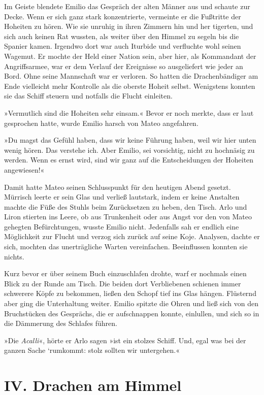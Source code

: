 Im Geiste blendete Emilio das Gespräch der alten Männer aus und
schaute zur Decke. Wenn er sich ganz stark konzentrierte, vermeinte
er die Fußtritte der Hoheiten zu hören. Wie sie unruhig in ihren
Zimmern hin und her tigerten, und sich auch keinen Rat wussten, als
weiter über den Himmel zu segeln bis die Spanier kamen. Irgendwo
dort war auch Iturbide und verfluchte wohl seinen Wagemut. Er
mochte der Held einer Nation sein, aber hier, als Kommandant der
Angriffsarmee, war er dem Verlauf der Ereignisse so ausgeliefert
wie jeder an Bord. Ohne seine Mannschaft war er verloren. So hatten
die Drachenbändiger am Ende vielleicht mehr Kontrolle als die
oberste Hoheit selbst. Wenigstens konnten sie das Schiff steuern
und notfalls die Flucht einleiten.

\bigpar

»Vermutlich sind die Hoheiten sehr einsam.« Bevor er noch merkte,
dass er laut gesprochen hatte, wurde Emilio harsch von Mateo
angefahren.

»Du magst das Gefühl haben, dass wir keine Führung haben, weil wir
hier unten wenig hören. Das verstehe ich. Aber Emilio, sei
vorsichtig, nicht zu hochnäsig zu werden. Wenn es ernst wird, sind
wir ganz auf die Entscheidungen der Hoheiten angewiesen!«

Damit hatte Mateo seinen Schlusspunkt für den heutigen Abend
gesetzt. Mürrisch leerte er sein Glas und verließ lautstark, indem
er keine Anstalten machte die Füße des Stuhls beim Zurücksetzen zu
heben, den Tisch. Arlo und Liron stierten ins Leere, ob aus
Trunkenheit oder aus Angst vor den von Mateo gehegten
Befürchtungen, wusste Emilio nicht. Jedenfalls sah er endlich eine
Möglichkeit zur Flucht und verzog sich zurück auf seine Koje.
Analysen, dachte er sich, mochten das unerträgliche Warten
vereinfachen. Beeinflussen konnten sie nichts.

Kurz bevor er über seinem Buch einzuschlafen drohte, warf er
nochmals einen Blick zu der Runde am Tisch. Die beiden dort
Verbliebenen schienen immer schwerere Köpfe zu bekommen, ließen den
Schopf tief ins Glas hängen. Flüsternd aber ging die Unterhaltung
weiter. Emilio spitzte die Ohren und ließ sich von den Bruchstücken
des Gesprächs, die er aufschnappen konnte, einlullen, und sich so
in die Dämmerung des Schlafes führen.

»Die \textit{Acalli}«, hörte er Arlo sagen »ist ein stolzes Schiff. Und,
egal was bei der ganzen Sache `rumkommt: stolz sollten wir
untergehen.«

\section{IV. Drachen am Himmel}

